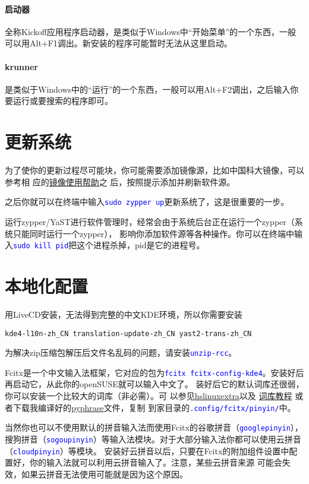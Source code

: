 \documentclass[10pt,openany]{book}
\newcommand{\command}[1]{\texttt{\textcolor{blue}{#1}}}
\newcommand{\soft}[1]{\texttt{\textcolor{blue}{#1}}}
\begin{document}
\paragraph{启动器} 全称Kickoff应用程序启动器，是类似于Windows中“开始菜单”的一个东西，一般可以用Alt+F1调出。新安装的程序可能暂时无法从这里启动。
\paragraph{krunner} 是类似于Windows中的“运行”的一个东西，一般可以用Alt+F2调出，之后输入你要运行或要搜索的程序即可。

\section{更新系统}
为了使你的更新过程尽可能块，你可能需要添加镜像源，比如中国科大镜像，可以参考相
应的\href{https://lug.ustc.edu.cn/wiki/mirrors/help/opensuse}{镜像使用帮助}之
后，按照提示添加并刷新软件源。

之后你就可以在终端中输入\command{sudo zypper up}更新系统了，这是很重要的一步。

运行zypper/YaST进行软件管理时，经常会由于系统后台正在运行一个zypper（系统只能同时运行一个zypper），
影响你添加软件源等各种操作。你可以在终端中输入\command{sudo kill pid}把这个进程杀掉，pid是它的进程号。

\section{本地化配置}
用LiveCD安装，无法得到完整的中文KDE环境，所以你需要安装
\begin{Verbatim}[formatcom=\color{codecolor}]
    kde4-l10n-zh_CN translation-update-zh_CN yast2-trans-zh_CN
\end{Verbatim}

为解决zip压缩包解压后文件名乱码的问题，请安装\soft{unzip-rcc}。

Fcitx是一个中文输入法框架，它对应的包为\soft{fcitx fcitx-config-kde4}。安装好后再启动它，从此你的openSUSE就可以输入中文了。
装好后它的默认词库还很弱，你可以安装一个比较大的词库（非必需）。可%
以参见\href{https://code.google.com/p/hslinuxextra/}{hs\-linux\-extra}以及%
\href{https://www.librehat.com/fcitx-sogou-pinyin-cell-database-convert-import-guide/}{词库教程}%
或者下载我编译好的\href{http://pan.baidu.com/s/1i3HtJ4T}{pyphrase}文件，复制
到家目录的\command{.config/fcitx/pinyin/}中。

当然你也可以不使用默认的拼音输入法而使用Fcitx的谷歌拼音（\soft{goo\-gle\-pin\-yin}），
搜狗拼音（\soft{so\-gou\-pin\-yin}）等输入法模块。对于大部分输入法你都可以使用云拼音（\soft{cloud\-pin\-yin}）等模块。
安装好云拼音以后，只要在Fcitx的附加组件设置中配置好，你的输入法就可以利用云拼音输入了。注意，某些云拼音来源
可能会失效，如果云拼音无法使用可能就是因为这个原因。
\end{document}
